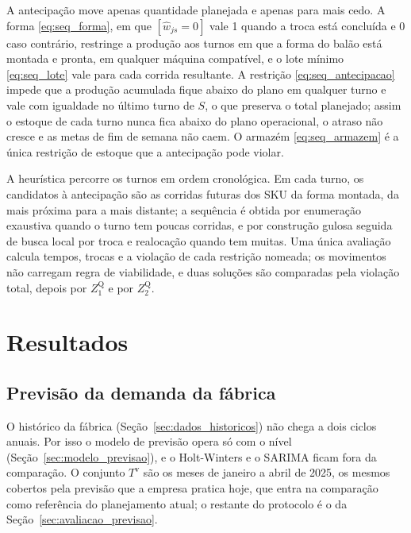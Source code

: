 \documentclass[
    12pt,
    openright,
    oneside,
    a4paper,
    fleqn,
    chapter=TITLE,
    section=TITLE,
    english,
    brazil
]{abntex2}
\begin{document}
A antecipação move apenas quantidade planejada e apenas para mais cedo. A forma \eqref{eq:seq_forma}, em que $[\hat{w}_{js} = 0]$ vale 1 quando a troca está concluída e 0 caso contrário, restringe a produção aos turnos em que a forma do balão está montada e pronta, em qualquer máquina compatível, e o lote mínimo \eqref{eq:seq_lote} vale para cada corrida resultante. A restrição \eqref{eq:seq_antecipacao} impede que a produção acumulada fique abaixo do plano em qualquer turno e vale com igualdade no último turno de $S$, o que preserva o total planejado; assim o estoque de cada turno nunca fica abaixo do plano operacional, o atraso não cresce e as metas de fim de semana não caem. O armazém \eqref{eq:seq_armazem} é a única restrição de estoque que a antecipação pode violar.

A heurística percorre os turnos em ordem cronológica. Em cada turno, os candidatos à antecipação são as corridas futuras dos SKU da forma montada, da mais próxima para a mais distante; a sequência é obtida por enumeração exaustiva quando o turno tem poucas corridas, e por construção gulosa seguida de busca local por troca e realocação quando tem muitas. Uma única avaliação calcula tempos, trocas e a violação de cada restrição nomeada; os movimentos não carregam regra de viabilidade, e duas soluções são comparadas pela violação total, depois por $Z^{\mathrm{Q}}_{1}$ e por $Z^{\mathrm{Q}}_{2}$.


\chapter{Resultados}
\label{sec:resultados}

\section{Previsão da demanda da fábrica}
\label{sec:resultado_previsao}

O histórico da fábrica (Seção~\ref{sec:dados_historicos}) não chega a dois ciclos anuais. Por isso o modelo de previsão opera só com o nível (Seção~\ref{sec:modelo_previsao}), e o Holt-Winters e o SARIMA ficam fora da comparação. O conjunto $T^{\mathrm{v}}$ são os meses de janeiro a abril de 2025, os mesmos cobertos pela previsão que a empresa pratica hoje, que entra na comparação como referência do planejamento atual; o restante do protocolo é o da Seção~\ref{sec:avaliacao_previsao}.

\begin{table}[htbp]
\centering
\small
\caption{Erro da previsão por balão na fábrica, de janeiro a abril de 2025, com o modelo proposto em negrito.}
\label{tab:previsao_fabrica}

\end{table}
\end{document}
